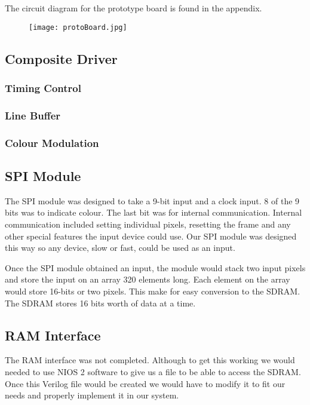 The circuit diagram for the prototype board is found in the appendix.

\begin{figure}[H]
    \centering
    \texttt{[image: protoBoard.jpg]}
    \caption{}
\end{figure}

\subsection{Composite Driver}

\subsubsection{Timing Control}

\subsubsection{Line Buffer}

\subsubsection{Colour Modulation}

\subsection{SPI Module}

The SPI module was designed to take a 9-bit input and a clock input. 8 of the
9 bits was to indicate colour. The last bit was for internal communication. 
Internal communication included setting individual pixels, resetting the frame 
and any other special features the input device could use. Our SPI module was
designed this way so any device, slow or fast, could be used as an input.

Once the SPI module obtained an input, the module would stack two input pixels
and store the input on an array 320 elements long. Each element on the array 
would store 16-bits or two pixels. This make for easy conversion to the SDRAM.
The SDRAM stores 16 bits worth of data at a time.


\subsection{RAM Interface}

The RAM interface was not completed. Although to get this working we would 
needed to use NIOS 2 software to give us a file to be able to access the 
SDRAM. Once this Verilog file would be created we would have to modify it to
fit our needs and properly implement it in our system.


